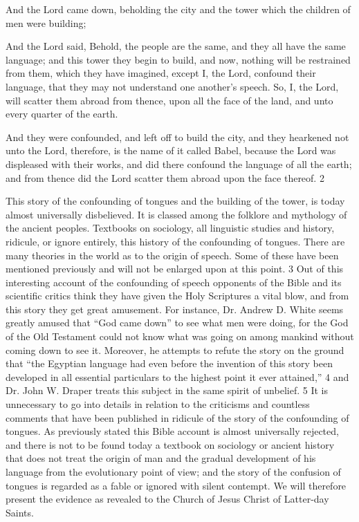 And the Lord came down, beholding the city and the tower which the children of men were
building;

And the Lord said, Behold, the people are the same, and they all have the same language; and
this tower they begin to build, and now, nothing will be restrained from them, which they
have imagined, except I, the Lord, confound their language, that they may not understand one
another's speech. So, I, the Lord, will scatter them abroad from thence, upon all the face of
the land, and unto every quarter of the earth.

And they were confounded, and left off to build the city, and they hearkened not unto the
Lord, therefore, is the name of it called Babel, because the Lord was displeased with their
works, and did there confound the language of all the earth; and from thence did the Lord
scatter them abroad upon the face thereof. 2

This story of the confounding of tongues and the building of the tower, is today almost
universally disbelieved. It is classed among the folklore and mythology of the ancient
peoples. Textbooks on sociology, all linguistic studies and history, ridicule, or ignore
entirely, this history of the confounding of tongues. There are many theories in the world as
to the origin of speech. Some of these have been mentioned previously and will not be
enlarged upon at this point. 3 Out of this interesting account of the confounding of speech
opponents of the Bible and its scientific critics think they have given the Holy Scriptures a
vital blow, and from this story they get great amusement. For instance, Dr. Andrew D. White
seems greatly amused that ``God came down'' to see what men were doing, for the God of the
Old Testament could not know what was going on among mankind without coming down to
see it. Moreover, he attempts to refute the story on the ground that ``the Egyptian language
had even before the invention of this story been developed in all essential particulars to the
highest point it ever attained,'' 4 and Dr. John W. Draper treats this subject in the same spirit
of unbelief. 5 It is unnecessary to go into details in relation to the criticisms and countless
comments that have been published in ridicule of the story of the confounding of tongues. As
previously stated this Bible account is almost universally rejected, and there is not to be
found today a textbook on sociology or ancient history that does not treat the origin of man
and the gradual development of his language from the evolutionary point of view; and the
story of the confusion of tongues is regarded as a fable or ignored with silent contempt. We
will therefore present the evidence as revealed to the Church of Jesus Christ of Latter-day
Saints.

